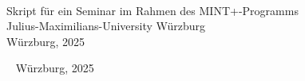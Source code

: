 \begin{titlepage}
  \centering\large
  ~
  \vfill  
  \textcolor{Maroon}{\Large{}} \\ \medskip
  \vfill
  \vspace{5cm}
  \vfill
  Skript für ein Seminar im Rahmen des MINT+-Programms\\
  Julius-Maximilians-University Würzburg\\
  Würzburg, 2025
  \vfill
\end{titlepage}

\thispagestyle{empty}%
~%
\vfill%
\noindent Würzburg, 2025
\cleardoublepage

